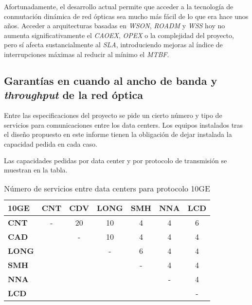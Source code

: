 Afortunadamente, el desarrollo actual permite que acceder a la
tecnología de conmutación dinámica de red ópticas sea mucho más fácil
de lo que era hace unos años. Acceder a arquitecturas basadas en
\emph{WSON}, \emph{ROADM} y \emph{WSS} hoy no aumenta
significativamente el \emph{CAOEX}, \emph{OPEX} o la complejidad del
proyecto, pero sí afecta sustancialmente al \emph{SLA}, introduciendo
mejoras al índice de interrupciones máximas al reducir al mínimo el
\emph{MTBF}.

\subsection{Garantías en cuando al ancho de banda y \emph{throughput}
  de la red óptica}
\label{sec:anchodebanda}

Entre las especificaciones del proyecto se pide un cierto número y
tipo de servicios para comunicaciones entre los data centers. Los
equipos instalados tras el diseño propuesto en este informe tienen la
obligación de dejar instalada la capacidad pedida en cada caso.

Las capacidades pedidas por data center y por protocolo de
transmisión se muestran en la tabla.

\begin{table}[H]
  \centering
  \begin{tabular}{| l | c | c | c | c | c | c |}
    \hline
    \textbf{10GE} & \textbf{CNT} & \textbf{CDV} & \textbf{LONG} & \textbf{SMH} & \textbf{NNA} & \textbf{LCD} \\
    \hline
    \textbf{CNT}  & - & 20 & 10 & 4 & 4 & 6 \\
    \hline
    \textbf{CAD}  &   & - & 10 & 4 & 4 & 4 \\
    \hline
    \textbf{LONG} &   &   & - & 6 & 4 & 4 \\
    \hline
    \textbf{SMH}  &   &   &   & - & 4 & 4 \\
    \hline
    \textbf{NNA}  &   &   &   &   & - & 4 \\
    \hline
    \textbf{LCD}  &   &   &   &   &   & - \\
    \hline
  \end{tabular}
  \caption{Número de servicios entre data centers para protocolo 10GE}
  \label{tab:10ge}
\end{table}

